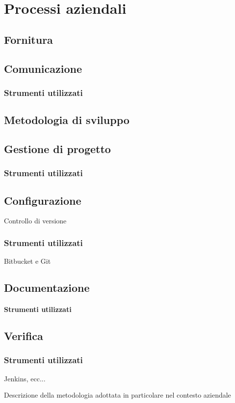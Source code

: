 \section{Processi aziendali}
\subsection{Fornitura}
\subsection{Comunicazione}
\subsubsection{Strumenti utilizzati}

\subsection{Metodologia di sviluppo}

\subsection{Gestione di progetto}
\subsubsection{Strumenti utilizzati}

\subsection{Configurazione}
Controllo di versione
\subsubsection{Strumenti utilizzati}
Bitbucket e Git

\subsection{Documentazione}
\paragraph{Strumenti utilizzati}

\subsection{Verifica}
\subsubsection{Strumenti utilizzati}
Jenkins, ecc...


Descrizione della metodologia adottata in particolare nel contesto aziendale

